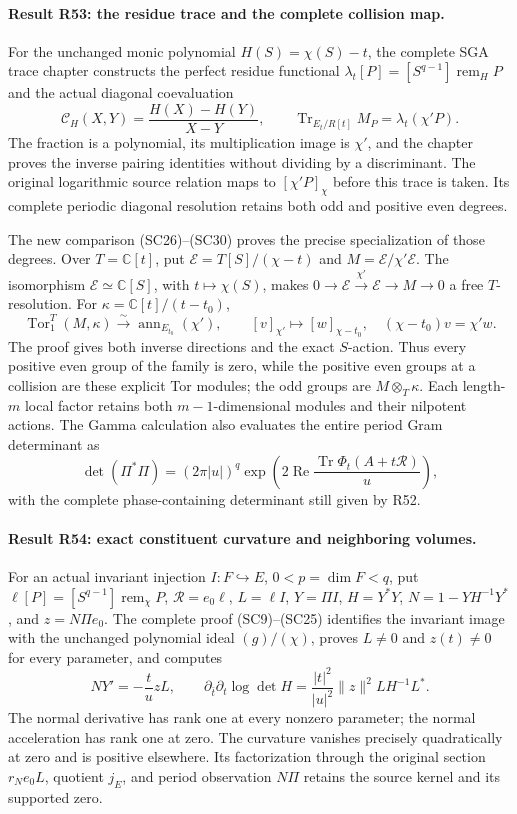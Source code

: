 \paragraph{Result R53: the residue trace and the complete collision map.}
For the unchanged monic polynomial \(H(S)=\chi(S)-t\), the complete
SGA trace chapter constructs the perfect residue functional
\(\lambda_t[P]=[S^{q-1}]\operatorname{rem}_H P\) and the actual
diagonal coevaluation
\[
 \mathcal C_H(X,Y)=\frac{H(X)-H(Y)}{X-Y},\qquad
 \operatorname{Tr}_{E_t/R[t]}M_P=\lambda_t(\chi'P).
\]
The fraction is a polynomial, its multiplication image is \(\chi'\),
and the chapter proves the inverse pairing identities without
dividing by a discriminant. The original logarithmic source
relation maps to \([\chi'P]_\chi\) before this trace is taken.
Its complete periodic diagonal resolution retains both odd and
positive even degrees.

The new comparison (SC26)--(SC30) proves the precise specialization
of those degrees. Over \(T=\mathbb C[t]\), put
\(\mathscr E=T[S]/(\chi-t)\) and \(M=\mathscr E/\chi'\mathscr E\).
The isomorphism \(\mathscr E\simeq\mathbb C[S]\), with
\(t\mapsto\chi(S)\), makes
\(0\to\mathscr E\xrightarrow{\chi'}\mathscr E\to M\to0\)
a free \(T\)-resolution. For \(\kappa=\mathbb C[t]/(t-t_0)\),
\[
 \operatorname{Tor}_1^T(M,\kappa)
 \xrightarrow{\sim}\operatorname{ann}_{E_{t_0}}(\chi'),
 \qquad [v]_{\chi'}\longmapsto[w]_{\chi-t_0},
 \quad(\chi-t_0)v=\chi'w.
\]
The proof gives both inverse directions and the exact \(S\)-action.
Thus every positive even group of the family is zero, while the
positive even groups at a collision are these explicit Tor modules;
the odd groups are \(M\otimes_T\kappa\). Each length-\(m\) local
factor retains both \(m-1\)-dimensional modules and their nilpotent
actions. The Gamma calculation also evaluates the entire period
Gram determinant as
\[
 \det(\Pi^*\Pi)=(2\pi|u|)^q
  \exp\left(2\operatorname{Re}
          \frac{\operatorname{Tr}\Phi_t(A+t\mathcal R)}u\right),
\]
with the complete phase-containing determinant still given by R52.

\paragraph{Result R54: exact constituent curvature and neighboring volumes.}
For an actual invariant injection \(I:F\hookrightarrow E\),
\(0<p=\dim F<q\), put
\(\ell[P]=[S^{q-1}]\operatorname{rem}_\chi P\),
\(\mathcal R=e_0\ell\), \(L=\ell I\),
\(Y=\Pi I\), \(H=Y^*Y\),
\(N=1-YH^{-1}Y^*\), and \(z=N\Pi e_0\).
The complete proof (SC9)--(SC25) identifies the invariant image
with the unchanged polynomial ideal \((g)/(\chi)\), proves
\(L\ne0\) and \(z(t)\ne0\) for every parameter, and computes
\[
 NY'=-\frac t u zL,\qquad
 \partial_{\bar t}\partial_t\log\det H
    =\frac{|t|^2}{|u|^2}\|z\|^2LH^{-1}L^*.
\]
The normal derivative has rank one at every nonzero parameter;
the normal acceleration has rank one at zero. The curvature
vanishes precisely quadratically at zero and is positive elsewhere.
Its factorization through the original section \(r_Ne_0L\),
quotient \(j_E\), and period observation \(N\Pi\) retains the
source kernel and its supported zero.

